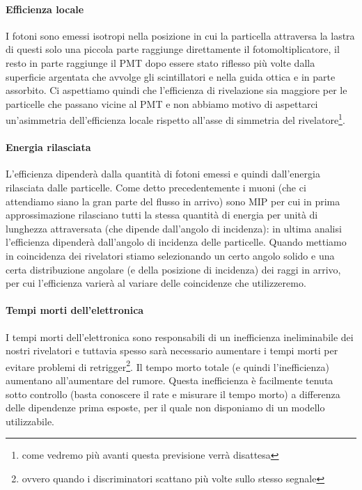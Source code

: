 \paragraph{Efficienza locale}
I fotoni sono emessi isotropi nella posizione in cui la particella attraversa la lastra di questi solo una piccola parte raggiunge direttamente il fotomoltiplicatore, il resto in parte raggiunge il PMT dopo essere stato riflesso più volte dalla superficie argentata che avvolge gli scintillatori e nella guida ottica e in parte assorbito. Ci aspettiamo quindi che l'efficienza di rivelazione sia maggiore per le particelle che passano vicine al PMT e non abbiamo motivo di aspettarci un'asimmetria dell'efficienza locale rispetto all'asse di simmetria del rivelatore\footnote{come vedremo più avanti questa previsione verrà disattesa}.

\paragraph{Energia rilasciata}
L'efficienza dipenderà dalla quantità di fotoni emessi e quindi dall'energia rilasciata dalle particelle. Come detto precedentemente i muoni (che ci attendiamo siano la gran parte del flusso in arrivo) sono MIP per cui in prima approssimazione rilasciano tutti la stessa quantità di energia per unità di lunghezza attraversata (che dipende dall'angolo di incidenza): in ultima analisi l'efficienza dipenderà dall'angolo di incidenza delle particelle.
Quando mettiamo in coincidenza dei rivelatori stiamo selezionando un certo angolo solido e una certa distribuzione angolare (e della posizione di incidenza) dei raggi in arrivo, per cui l'efficienza varierà al variare delle coincidenze che utilizzeremo.

\paragraph{Tempi morti dell'elettronica}
I tempi morti dell'elettronica sono responsabili di un inefficienza ineliminabile dei nostri rivelatori e tuttavia spesso sarà necessario aumentare i tempi morti per evitare problemi di retrigger\footnote{ovvero quando i discriminatori scattano più volte sullo stesso segnale}. Il tempo morto totale (e quindi l'inefficienza) aumentano all'aumentare del rumore. Questa inefficienza è facilmente tenuta sotto controllo (basta conoscere il rate e misurare il tempo morto) a differenza delle dipendenze prima esposte, per il quale non disponiamo di un modello utilizzabile.

